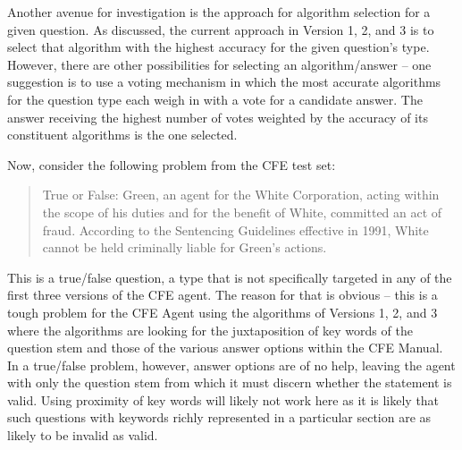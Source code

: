 Another avenue for investigation is the approach for algorithm selection for a given question.  As discussed, the current approach in Version 1, 2, and 3 is to select that algorithm with the highest accuracy for the given question's type.  However, there are other possibilities for selecting an algorithm/answer -- one suggestion is to use a voting mechanism in which the most accurate algorithms for the question type each weigh in with a vote for a candidate answer.  The answer receiving the highest number of votes weighted by the accuracy of its constituent algorithms is the one selected.

Now, consider the following problem from the CFE test set:

\blockquote{True or False: Green, an agent for the White Corporation, acting within the scope of his duties and for the benefit of White, committed an act of fraud. According to the Sentencing Guidelines effective in 1991, White cannot be held criminally liable for Green's actions. \cite{acfe_study_package_2011}}

This is a true/false question, a type that is not specifically targeted in any of the first three versions of the CFE agent. The reason for that is obvious – this is a tough problem for the CFE Agent using the algorithms of Versions 1, 2, and 3 where the algorithms are looking for the juxtaposition of key words of the question stem and those of the various answer options within the CFE Manual. In a true/false problem, however, answer options are of no help, leaving the agent with only the question stem from which it must discern whether the statement is valid.  Using proximity of key words will likely not work here as it is likely that such questions with keywords richly represented in a particular section are as likely to be invalid as valid. 

